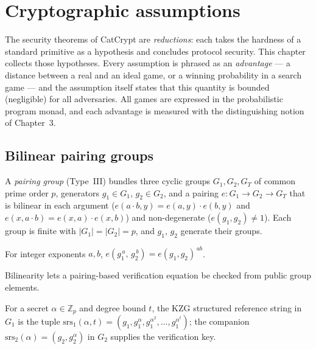 \chapter{Cryptographic assumptions}

The security theorems of CatCrypt are \emph{reductions}: each takes the hardness
of a standard primitive as a hypothesis and concludes protocol security. This
chapter collects those hypotheses. Every assumption is phrased as an
\emph{advantage} --- a distance between a real and an ideal game, or a winning
probability in a search game --- and the assumption itself states that this
quantity is bounded (negligible) for all adversaries. All games are expressed in
the probabilistic program monad, and each advantage is measured with the
distinguishing notion of Chapter~3.

\section{Bilinear pairing groups}

\begin{definition}
  \label{def:pairing-group}
  \leanok
  A \emph{pairing group} (Type~III) bundles three cyclic groups
  $G_1, G_2, G_T$ of common prime order $p$, generators $g_1 \in G_1$,
  $g_2 \in G_2$, and a pairing $e : G_1 \to G_2 \to G_T$ that is bilinear in
  each argument ($e(a\cdot b, y) = e(a,y)\cdot e(b,y)$ and
  $e(x, a\cdot b) = e(x,a)\cdot e(x,b)$) and non-degenerate ($e(g_1, g_2) \neq 1$).
  Each group is finite with $|G_1| = |G_2| = p$, and $g_1$, $g_2$ generate their
  groups.
\end{definition}

\begin{lemma}
  \label{def:pairing-bilinear}
  \leanok
  For integer exponents $a, b$,
  $e(g_1^{\,a},\, g_2^{\,b}) = e(g_1, g_2)^{\,a b}$.
\end{lemma}

Bilinearity lets a pairing-based verification equation be checked from public group
elements.

\begin{definition}
  \label{def:kzg-srs}
  \leanok
  For a secret $\alpha \in \mathbb{Z}_p$ and degree bound $t$, the KZG
  structured reference string in $G_1$ is the tuple
  $\mathrm{srs}_1(\alpha, t) = (g_1, g_1^{\alpha}, g_1^{\alpha^2}, \dots,
  g_1^{\alpha^t})$; the companion $\mathrm{srs}_2(\alpha) = (g_2, g_2^{\alpha})$
  in $G_2$ supplies the verification key.
\end{definition}

